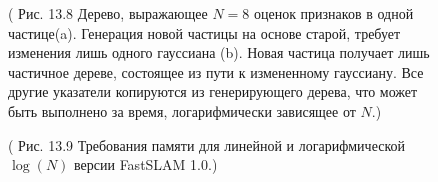 \documentclass[10pt,a4paper]{article}
\begin{document}
\begin{figure}[H]
	\caption{ ( Рис. 13.8    Дерево, выражающее $N=8$ оценок признаков в одной частице(a).
 Генерация новой частицы на основе старой, требует изменения лишь одного гауссиана (b). Новая частица получает лишь частичное дереве, состоящее из пути к измененному гауссиану. Все другие указатели копируются из генерирующего дерева, что может быть выполнено за время, логарифмически зависящее от $N$.) }
	\label{fig:138orig}
\end{figure}

\begin{figure}[H]
	\caption{ ( Рис. 13.9 Требования памяти для линейной и логарифмической $\log(N )$ версии FastSLAM 1.0.) }
	\label{fig:139orig}
\end{figure}
\end{document}

